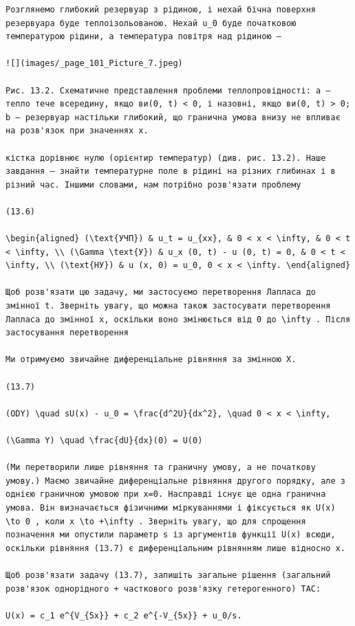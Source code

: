 \documentclass[
  ukrainian,
]{article}
\begin{document}
\begin{verbatim}
Розглянемо глибокий резервуар з рідиною, і нехай бічна поверхня резервуара буде теплоізольованою. Нехай u_0 буде початковою температурою рідини, а температура повітря над рідиною —

![](images/_page_101_Picture_7.jpeg)

Рис. 13.2. Схематичне представлення проблеми теплопровідності: a — тепло тече всередину, якщо ви(0, t) < 0, і назовні, якщо ви(0, t) > 0; b — резервуар настільки глибокий, що гранична умова внизу не впливає на розв'язок при значеннях x.

кістка дорівнює нулю (орієнтир температур) (див. рис. 13.2). Наше завдання — знайти температурне поле в рідині на різних глибинах і в різний час. Іншими словами, нам потрібно розв'язати проблему

(13.6)

\begin{aligned} (\text{УЧП}) & u_t = u_{xx}, & 0 < x < \infty, & 0 < t < \infty, \\ (\Gamma \text{У}) & u_x (0, t) - u (0, t) = 0, & 0 < t < \infty, \\ (\text{НУ}) & u (x, 0) = u_0, 0 < x < \infty. \end{aligned}

Щоб розв'язати цю задачу, ми застосуємо перетворення Лапласа до змінної t. Зверніть увагу, що можна також застосувати перетворення Лапласа до змінної x, оскільки воно змінюється від 0 до \infty . Після застосування перетворення

Ми отримуємо звичайне диференціальне рівняння за змінною X.

(13.7)

(ODY) \quad sU(x) - u_0 = \frac{d^2U}{dx^2}, \quad 0 < x < \infty,

(\Gamma Y) \quad \frac{dU}{dx}(0) = U(0)

(Ми перетворили лише рівняння та граничну умову, а не початкову умову.) Маємо звичайне диференціальне рівняння другого порядку, але з однією граничною умовою при x=0. Насправді існує ще одна гранична умова. Він визначається фізичними міркуваннями і фіксується як U(x) \to 0 , коли x \to +\infty . Зверніть увагу, що для спрощення позначення ми опустили параметр s із аргументів функції U(x) всюди, оскільки рівняння (13.7) є диференціальним рівнянням лише відносно x.

Щоб розв'язати задачу (13.7), запишіть загальне рішення (загальний розв'язок однорідного + часткового розв'язку гетерогенного) TAC:

U(x) = c_1 e^{V_{5x}} + c_2 e^{-V_{5x}} + u_0/s.


\end{verbatim}
\end{document}
